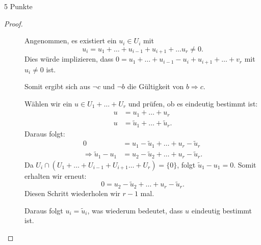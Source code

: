 \documentclass{problemset}
\begin{document}
\begin{problem}{5 Punkte}
\begin{proof}
\begin{enumerate}
\begin{description}
                  \item[]

                        Angenommen, es existiert ein $u_i \in U_i$ mit
                        \[
                            u_i = u_1 + \ldots + u_{i-1} + u_{i+1} + \ldots u_r \neq 0.
                        \]
                        Dies würde implizieren, dass $0 = u_1 + \ldots + u_{i-1} - u_i + u_{i+1} +
                            \ldots + v_r$ mit $u_i \neq 0$ ist.

                        Somit ergibt sich aus $\neg c$ und $\neg b$ die Gültigkeit von $b \Rightarrow
                            c$.

                  \item[]

                        Wählen wir ein $u \in U_1 + \ldots + U_r$ und prüfen, ob es eindeutig bestimmt
                        ist:
                        \begin{align*}
                            u & = u_1 + \ldots + u_r                  \\
                            u & = \tilde{u}_1 + \ldots + \tilde{u}_r.
                        \end{align*}
                        Daraus folgt:
                        \begin{align*}
                            0                             & = u_1 - \tilde{u}_1 + \ldots + u_r - \tilde{u}_r  \\
                            \Rightarrow \tilde{u}_1 - u_1 & = u_2 - \tilde{u}_2 + \ldots + u_r - \tilde{u}_r.
                        \end{align*}
                        Da $U_i \cap (U_1 + \ldots + U_{i-1} + U_{i+1} \ldots + U_r) = \{0\}$, folgt $\tilde{u}_1 - u_1 = 0$.
                        Somit erhalten wir erneut:
                        \[
                            0 = u_2 - \tilde{u}_2 + \ldots + u_r - \tilde{u}_r.
                        \]
                        Diesen Schritt wiederholen wir $r-1$ mal.

                        Daraus folgt $u_i = \tilde{u}_i$, was wiederum bedeutet, dass $u$ eindeutig
                        bestimmt ist. \checkmark
              \end{description}
    \end{enumerate}
\end{proof}
\end{problem}
\end{document}
